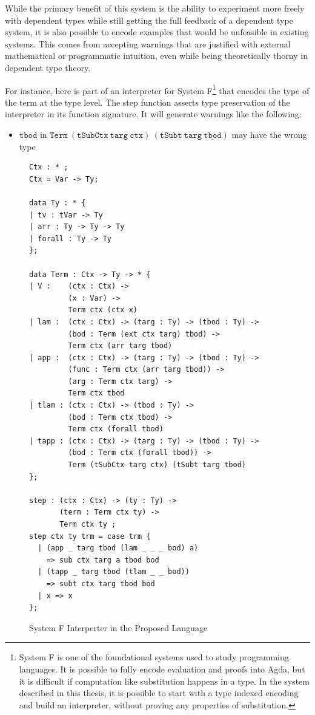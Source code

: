 While the primary benefit of this system is the ability to experiment more freely with dependent types while still getting the full feedback of a dependent type system, it is also possible to encode examples that would be unfeasible in existing systems.
This comes from accepting warnings that are justified with external mathematical or programmatic intuition, even while being theoretically thorny in dependent type theory.

For instance, here is part of an interpreter for System F\footnote{
 System F is one of the foundational systems used to study programming languages.
 It is possible to fully encode evaluation and proofs into Agda, but it is difficult if computation like substitution happens in a type.
 In the system described in this thesis, it is possible to start with a type indexed encoding and build an interpreter, without proving any properties of substitution.
} that encodes the type of the term at the type level.
The step function asserts type preservation of the interpreter in its function signature.
It will generate warnings like the following:


\begin{itemize}
\item $\mathtt{tbod}$ in $\mathtt{Term\ (tSubCtx\ targ\ ctx)\ (tSubt\ targ\ \underline{tbod})}$
may have the wrong type
\end{itemize}

\begin{figure}
\begin{lstlisting}[basicstyle={\ttfamily\small}]
Ctx : * ;
Ctx = Var -> Ty;

data Ty : * {
| tv : tVar -> Ty
| arr : Ty -> Ty -> Ty
| forall : Ty -> Ty
};

data Term : Ctx -> Ty -> * {
| V :    (ctx : Ctx) -> 
         (x : Var) -> 
         Term ctx (ctx x)
| lam :  (ctx : Ctx) -> (targ : Ty) -> (tbod : Ty) ->
         (bod : Term (ext ctx targ) tbod) ->
         Term ctx (arr targ tbod)
| app :  (ctx : Ctx) -> (targ : Ty) -> (tbod : Ty) ->
         (func : Term ctx (arr targ tbod)) ->
         (arg : Term ctx targ) ->
         Term ctx tbod
| tlam : (ctx : Ctx) -> (tbod : Ty) ->
         (bod : Term ctx tbod) ->
         Term ctx (forall tbod)
| tapp : (ctx : Ctx) -> (targ : Ty) -> (tbod : Ty) ->
         (bod : Term ctx (forall tbod)) ->
         Term (tSubCtx targ ctx) (tSubt targ tbod)
};

step : (ctx : Ctx) -> (ty : Ty) ->
       (term : Term ctx ty) -> 
       Term ctx ty ;
step ctx ty trm = case trm {
  | (app _ targ tbod (lam _ _ _ bod) a) 
    => sub ctx targ a tbod bod
  | (tapp _ targ tbod (tlam _ _ bod))   
    => subt ctx targ tbod bod
  | x => x
};
\end{lstlisting}

\caption{System F Interperter in the Proposed Language}
\label{fig:ex-sysf}
\end{figure}

